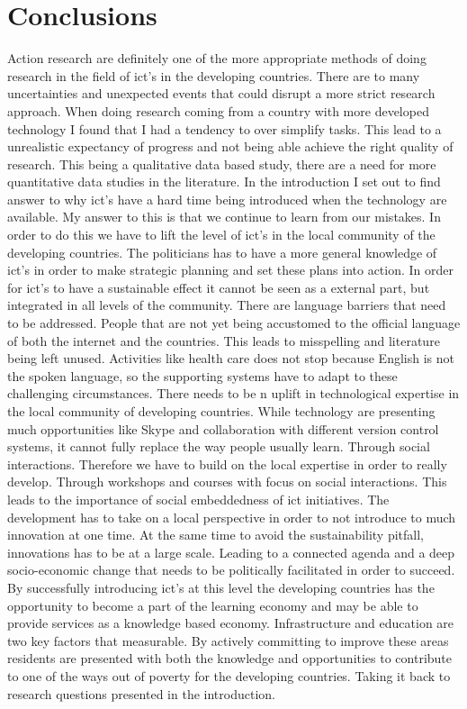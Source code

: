 \chapter{Conclusions}
Action research are definitely one of the more appropriate methods of doing research in the field of \gls{ict}'s in the developing countries. 
There are to many uncertainties and unexpected events that could disrupt a more strict research approach.
When doing research coming from a country with more developed technology I found that I had a tendency to over simplify tasks.
This lead to a unrealistic expectancy of progress and not being able achieve the right quality of research.
This being a qualitative data based study, there are a need for more quantitative data studies in the literature.
In the introduction I set out to find answer to why \gls{ict}'s have a hard time being introduced when the technology are available.
My answer to this is that we continue to learn from our mistakes.
In order to do this we have to lift the level of \gls{ict}'s in the local community of the developing countries.
The politicians has to have a more general knowledge of \gls{ict}'s in order to make strategic planning and set these plans into action.
In order for \gls{ict}'s to have a sustainable effect it cannot be seen as a external part, but integrated in all levels of the community.
There are language barriers that need to be addressed. 
People that are not yet being accustomed to the official language of both the internet and the countries.
This leads to misspelling and literature being left unused. 
Activities like health care does not stop because English is not the spoken language, so the supporting systems have to adapt to these challenging circumstances.
There needs to be n uplift in technological expertise in the local community of developing countries. 
While technology are presenting much opportunities like Skype and collaboration with different version control systems, it cannot fully replace the way people usually learn. Through social interactions. 
Therefore we have to build on the local expertise in order to really develop. 
Through workshops and courses with focus on social interactions. 
This leads to the importance of social embeddedness of \gls{ict} initiatives.
The development has to take on a local perspective in order to not introduce to much innovation at one time. 
At the same time to avoid the sustainability pitfall, innovations has to be at a large scale.
Leading to a connected agenda and a deep socio-economic change that needs to be politically facilitated in order to succeed.
By successfully introducing \gls{ict}'s at this level the developing countries has the opportunity to become a part of the learning economy and may be able to provide services as a knowledge based economy. 
Infrastructure and education are two key factors that measurable.
By actively committing to improve these areas residents are presented with both the knowledge and opportunities to contribute to one of the ways out of poverty for the developing countries. 
Taking it back to research questions presented in the introduction.

